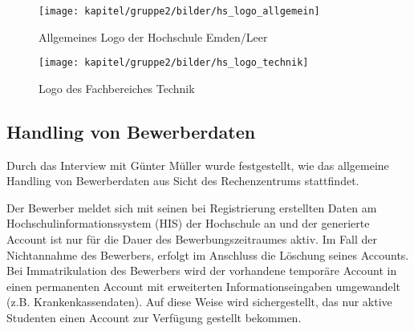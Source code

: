 \begin{figure}[h!]
	\centering
	\texttt{[image: kapitel/gruppe2/bilder/hs\_logo\_allgemein]}
	\caption{Allgemeines Logo der Hochschule Emden/Leer}
	\label{fig_logo_allgemein}
\end{figure}

\begin{figure}[h!]
	\centering
	\texttt{[image: kapitel/gruppe2/bilder/hs\_logo\_technik]}
	\caption{Logo des Fachbereiches Technik}
	\label{fig_logo_fb_technik}
\end{figure}

\subsection{Handling von Bewerberdaten}
Durch das Interview mit Günter Müller wurde festgestellt, wie das allgemeine Handling von 
Bewerberdaten aus Sicht des Rechenzentrums stattfindet. 

Der Bewerber meldet sich mit seinen bei Registrierung erstellten Daten am Hochschulinformationssystem (HIS) der Hochschule an und der generierte Account ist nur 
für die Dauer des Bewerbungszeitraumes aktiv. Im Fall der Nichtannahme des Bewerbers, 
erfolgt im Anschluss die Löschung seines Accounts. Bei Immatrikulation des Bewerbers wird 
der vorhandene temporäre Account in einen permanenten Account mit erweiterten 
Informationseingaben umgewandelt (z.B. Krankenkassendaten). Auf diese Weise wird 
sichergestellt, das nur aktive Studenten einen Account zur Verfügung gestellt bekommen. 
